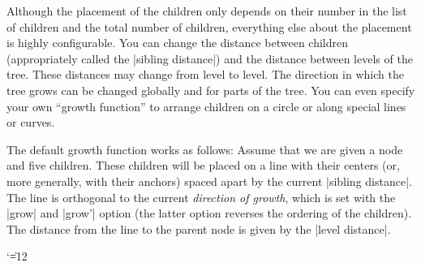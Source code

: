 Although the placement of the children only depends on their number in
the list of children and the total number of children, everything else
about the placement is highly configurable. You can change the
distance between children (appropriately called the
|sibling distance|) and the distance between levels of the tree. These
distances may change from level to level. The direction in which the
tree grows can be changed globally and for parts of the tree. You can
even specify your own ``growth function'' to arrange children on a
circle or along special lines or curves. 

The default growth function works as follows: Assume that we are given
a node and five children. These children will be placed on a line with
their centers (or, more generally, with their anchors) spaced apart by
the current |sibling distance|. The line is 
orthogonal to the current \emph{direction of growth}, which is set
with the |grow| and |grow'| option (the latter option reverses the
ordering of the children). The distance from the line to the parent node
is given by the |level distance|.

{\catcode`\|=12
\begin{codeexample}[]
\end{codeexample}
}

